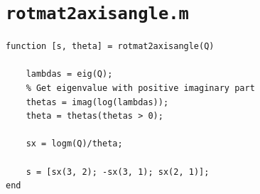 \documentclass[11pt]{article}
\begin{document}
\appendix
\section{\texttt{rotmat2axisangle.m}}
\label{sec:org7748d54}
\label{appendix:source}

\begin{verbatim}
function [s, theta] = rotmat2axisangle(Q)

    lambdas = eig(Q);
    % Get eigenvalue with positive imaginary part
    thetas = imag(log(lambdas));
    theta = thetas(thetas > 0);

    sx = logm(Q)/theta;

    s = [sx(3, 2); -sx(3, 1); sx(2, 1)];
end
\end{verbatim}
\end{document}

